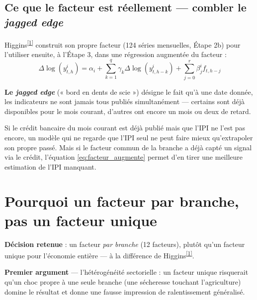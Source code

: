 \documentclass[11pt,a4paper]{article}
\newcommand{\cit}[1]{\textsuperscript{\hyperlink{ref#1}{[#1]}}}
\begin{document}
\subsection{Ce que le facteur est réellement --- combler le \emph{jagged edge}}

Higgins\cit{1} construit son propre facteur (124 séries mensuelles, Étape 2b) pour l'utiliser ensuite, à l'Étape 3, dans une régression augmentée du facteur :
\begin{equation}
\Delta\log(y_{t,h}^i) = \alpha_i + \sum_{k=1}^{q}\gamma_k \Delta\log(y_{t,h-k}^i) + \sum_{j=0}^{r}\beta_j^i f_{t,h-j}
\label{eq:facteur_augmente}
\end{equation}

\begin{definitionbox}
\textbf{Le \emph{jagged edge}} (« bord en dents de scie ») désigne le fait qu'à une date donnée, les indicateurs ne sont jamais tous publiés simultanément --- certains sont déjà disponibles pour le mois courant, d'autres ont encore un mois ou deux de retard.
\end{definitionbox}

\begin{intuition}
Si le crédit bancaire du mois courant est déjà publié mais que l'IPI ne l'est pas encore, un modèle qui ne regarde que l'IPI seul ne peut faire mieux qu'extrapoler son propre passé. Mais si le facteur commun de la branche a déjà capté un signal via le crédit, l'équation \ref{eq:facteur_augmente} permet d'en tirer une meilleure estimation de l'IPI manquant.
\end{intuition}

\section{Pourquoi un facteur par branche, pas un facteur unique}

\begin{ancrebox}
\textbf{Décision retenue} : un facteur \emph{par branche} (12 facteurs), plutôt qu'un facteur unique pour l'économie entière --- à la différence de Higgins\cit{1}.
\end{ancrebox}

\textbf{Premier argument} --- l'hétérogénéité sectorielle : un facteur unique risquerait qu'un choc propre à une seule branche (une sécheresse touchant l'agriculture) domine le résultat et donne une fausse impression de ralentissement généralisé.
\end{document}
